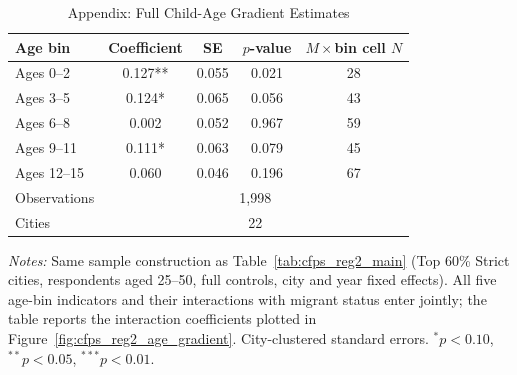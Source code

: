 \begin{table}[htbp]
\centering
\caption{Appendix: Full Child-Age Gradient Estimates}
\label{tab:cfps_reg2_mechanism_app}
\begin{threeparttable}
\begin{tabular}{lcccc}
\toprule
Age bin & Coefficient & SE & $p$-value & $M\times$bin cell $N$ \\
\midrule
Ages 0--2 & 0.127** & 0.055 & 0.021 & 28 \\
Ages 3--5 & 0.124* & 0.065 & 0.056 & 43 \\
Ages 6--8 & 0.002 & 0.052 & 0.967 & 59 \\
Ages 9--11 & 0.111* & 0.063 & 0.079 & 45 \\
Ages 12--15 & 0.060 & 0.046 & 0.196 & 67 \\
\midrule
Observations & \multicolumn{4}{c}{1,998} \\
Cities & \multicolumn{4}{c}{22} \\
\bottomrule
\end{tabular}
\begin{tablenotes}[flushleft]
\footnotesize
\item \textit{Notes:} Same sample construction as Table~\ref{tab:cfps_reg2_main} (Top 60\% Strict cities, respondents aged 25--50, full controls, city and year fixed effects). All five age-bin indicators and their interactions with migrant status enter jointly; the table reports the interaction coefficients plotted in Figure~\ref{fig:cfps_reg2_age_gradient}. City-clustered standard errors. $^{*}p<0.10$, $^{**}p<0.05$, $^{***}p<0.01$.
\end{tablenotes}
\end{threeparttable}
\end{table}
